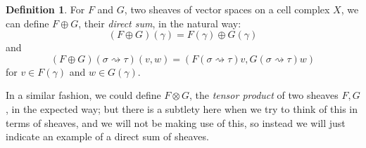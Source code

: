 \documentclass[11pt]{book}
\theoremstyle{definition}
\theoremstyle{definition}
\newtheorem{definition}{Definition}[section]
\theoremstyle{definition}
\theoremstyle{theorem}
\theoremstyle{definition}
\begin{document}
	\begin{definition}
	For $F$ and $G$, two sheaves of vector spaces on a cell complex $X$, we can define $F \oplus G$, their \textit{direct sum}, in the natural way: 
	\begin{equation*}
	(F \oplus G)(\gamma) = F(\gamma) \oplus G(\gamma) 
	\end{equation*} 
	and 
	\begin{equation*}
	(F \oplus G)(\sigma \rightsquigarrow \tau)(v, w) = (F(\sigma \rightsquigarrow \tau)v, G(\sigma \rightsquigarrow \tau)w) 
	\end{equation*}
	for $v \in F(\gamma)$ and $w \in G(\gamma)$.  
	\end{definition} \noindent 
In a similar fashion, we could define $F \otimes G$, the \textit{tensor product} of two sheaves $F, G$, in the expected way; but there is a subtlety here when we try to think of this in terms of sheaves, and we will not be making use of this, so instead we will just indicate an example of a direct sum of sheaves. 
\end{document}
